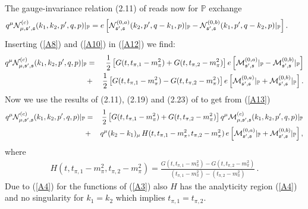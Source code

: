 \documentclass[a4paper,11pt]{article}
\newcommand{\nn}{\nonumber}
\newcommand{\Pom}{\mathbb{P}}
\begin{document}
The gauge-invariance relation (2.11) of \cite{Lebiedowicz:2025xob} 
reads now for $\Pom$ exchange
%
\begin{eqnarray}
q^{\mu} {\cal N}^{(c)}_{\mu, \mathfrak{s'},\mathfrak{s}}(k_{1},k_{2},p',q,p)|_{\Pom}
= e 
\left[
{\cal N}^{(0,a)}_{\mathfrak{s'},\mathfrak{s}}(k_{2},p',q-k_{1},p)|_{\Pom}
-
{\cal N}^{(0,b)}_{\mathfrak{s'},\mathfrak{s}}(k_{1},p',q-k_{2},p)|_{\Pom}
\right]. \qquad
\label{A12}
\end{eqnarray}
%
Inserting (\ref{A8}) and (\ref{A10}) in (\ref{A12}) we find:
%
\begin{eqnarray}
q^{\mu} {\cal N}^{(c)}_{\mu, \mathfrak{s'},\mathfrak{s}}(k_{1},k_{2},p',q,p)|_{\Pom}
&=&
\frac{1}{2} \left[ 
G(t,t_{\pi,1}-m_{\pi}^{2}) +
G(t,t_{\pi,2}-m_{\pi}^{2}) \right]
e
\left[
{\cal M}^{(0,a)}_{\mathfrak{s'},\mathfrak{s}}|_{\Pom}
-
{\cal M}^{(0,b)}_{\mathfrak{s'},\mathfrak{s}}|_{\Pom}
\right] \nn \\
&+&
\frac{1}{2} \left[ 
G(t,t_{\pi,1}-m_{\pi}^{2}) -
G(t,t_{\pi,2}-m_{\pi}^{2}) \right]
e
\left[
{\cal M}^{(0,a)}_{\mathfrak{s'},\mathfrak{s}}|_{\Pom}
+
{\cal M}^{(0,b)}_{\mathfrak{s'},\mathfrak{s}}|_{\Pom}
\right].\nn \\
\label{A13}
\end{eqnarray}
%
Now we use the results of (2.11), (2.19) and (2.23) of \cite{Lebiedowicz:2025xob}
to get from (\ref{A13})
%
\begin{eqnarray}
q^{\mu} {\cal N}^{(c)}_{\mu, \mathfrak{s'},\mathfrak{s}}(k_{1},k_{2},p',q,p)|_{\Pom}
&=&
\frac{1}{2} \left[ 
G(t,t_{\pi,1}-m_{\pi}^{2}) +
G(t,t_{\pi,2}-m_{\pi}^{2}) \right]
q^{\mu} {\cal M}^{(c)}_{\mu, \mathfrak{s'},\mathfrak{s}}(k_{1},k_{2},p',q,p)|_{\Pom} \nn \\
&+&
q^{\mu} (k_{2} - k_{1})_{\mu}\,
H(t,t_{\pi,1}-m_{\pi}^{2},t_{\pi,2}-m_{\pi}^{2})\,
e \left[
{\cal M}^{(0,a)}_{\mathfrak{s'},\mathfrak{s}}|_{\Pom}
+
{\cal M}^{(0,b)}_{\mathfrak{s'},\mathfrak{s}}|_{\Pom}
\right],\nn \\
\label{A14}
\end{eqnarray}
%
where
%
\begin{align}
H(t,t_{\pi,1}-m_{\pi}^{2},t_{\pi,2}-m_{\pi}^{2})
=\frac{G(t,t_{\pi,1}-m_{\pi}^{2}) - G(t,t_{\pi,2}-m_{\pi}^{2})}{(t_{\pi,1} - m_{\pi}^{2}) - (t_{\pi,2} - m_{\pi}^{2})}\,.
\label{A15}
\end{align}
%
Due to (\ref{A4}) for the functions of (\ref{A3}) also $H$
has the analyticity region (\ref{A4})
and no singularity for $k_{1} = k_{2}$
which implies $t_{\pi,1} = t_{\pi,2}$.
\end{document}
